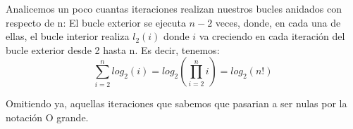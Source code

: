 \documentclass[11pt]{article}
\begin{document}
\begin{enumerate}
Analicemos un poco cuantas iteraciones realizan nuestros bucles anidados con respecto de n:
El bucle exterior se ejecuta $n-2$ veces,  donde, en cada una de ellas, el bucle interior realiza $l_2(i)$ donde $i$ va creciendo en cada iteración del bucle exterior desde 2 hasta n. Es decir, tenemos:
\[ \sum_{i=2}^{n} log_2  (i) = log_2 (\prod_{i=2}^{n}i) = log_2 (n!) \]

Omitiendo ya, aquellas iteraciones que sabemos que pasarian a ser nulas por la notación O grande.

	
\end{enumerate}
\end{document}
